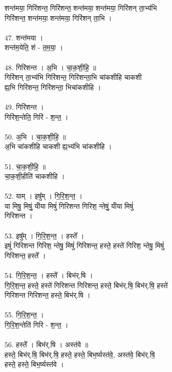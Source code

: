 शन्त॑मया॒ गिरि॑शन्त॒ गिरि॑शन्त॒ शन्त॑मया॒ शन्त॑मया॒ गिरि॑शन् ता॒भ्य॑भि\\
गिरि॑शन्त॒ शन्त॑मया॒ शन्त॑मया॒ गिरि॑शन् ता॒भि ।\\
\\
47. शन्त॑मया ।\\
शन्त॑म॒येति॒ शं - त॒म॒या॒ ।\\
\\
48. गिरि॑शन्त । अ॒भि । चा॒क॒शी॒हि॒ ॥\\
गिरि॑शन् ता॒भ्य॑भि गिरि॑शन्त॒ गिरि॑शन्ता॒भि चा॑कशीहि चाकशी\\
ह्य॒भि गिरि॑शन्त॒ गिरि॑शन्ता॒ भिचा॑कशीहि ।\\
\\
49. गिरि॑शन्त ।\\
गिरि॑श॒न्तेति॒ गिरि॑ - श॒न्त॒ ।\\
\\
50. अ॒भि । चा॒क॒शी॒हि॒ ॥\\
अ॒भि चा॑कशीहि चाकशी ह्य॒भ्य॑भि चा॑कशीहि ।\\
\\
51. चा॒क॒शी॒हि॒ ॥\\
चा॒क॒शी॒हीति॑ चाकशीहि ।\\
\\
52. याम् । इषु᳚म् । गि॒रि॒श॒न्त॒ । \\
या मिषु॒ मिषुं॒ यांँया मिषुं॑ गिरिशन्त गिरिश॒ न्तेषुं॒ यांँया मिषुं॑\\
गिरिशन्त ।\\
\\
53. इषु᳚म् । गि॒रि॒श॒न्त॒ । हस्ते᳚ ।\\
इषुं॑ गिरिशन्त गिरिश॒ न्तेषु॒ मिषुं॑ गिरिशन्त॒ हस्ते॒ हस्ते॑ गिरिश॒ न्तेषु॒ मिषुं॑\\
गिरिशन्त॒ हस्ते᳚ ।\\
\\
54. गि॒रि॒श॒न्त॒ । हस्ते᳚ । बिभ॑र्.षि ।\\
गि॒रि॒श॒न्त॒ हस्ते॒ हस्ते॑ गिरिशन्त गिरिशन्त॒ हस्ते॒ बिभ॑र्.षि॒ बिभ॑र्.षि॒ हस्ते॑\\
गिरिशन्त गिरिशन्त॒ हस्ते॒ बिभ॑र्.षि ।\\
\\
55. गि॒रि॒श॒न्त॒ ।\\
गि॒रि॒श॒न्तेति॑ गिरि - श॒न्त॒ ।\\
\\
56. हस्ते᳚ । बिभ॑र्.षि । अस्त॑वे ॥\\
हस्ते॒ बिभ॑र्.षि॒ बिभ॑र्.षि॒ हस्ते॒ हस्ते॒ बिभ॒र्ष्यस्त॑वे॒, अस्त॑वे॒ बिभ॑र्.षि॒\\
हस्ते॒ हस्ते॒ बिभ॒र्ष्यस्त॑वे ।\\
